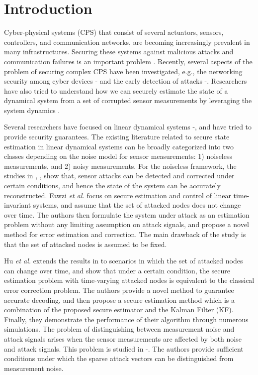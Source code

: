 
\section{Introduction}\label{sec:introduction}

Cyber-physical systems (CPS) that consist of several actuators, sensors, controllers, and communication networks, are becoming increasingly prevalent in many infrastructures. Securing these systems against malicious attacks and communication failures is an important problem \cite{cps1}. Recently, several aspects of the problem of securing complex CPS have been investigated, e.g., the networking security among cyber devices \cite{security_0}-\!\!\cite{comm_net_4} and the early detection of attacks \cite{comm_early_1}-\!\!\cite{comm_early_2}. Researchers have also tried to understand how we can securely estimate the state of a dynamical system from a set of corrupted sensor measurements by leveraging the system dynamics \cite{Fawzi:2014}.



Several researchers have focused on linear dynamical systems \cite{Fawzi:2014}-\!\!\cite{new4}, and have tried to provide security guarantees. The existing literature related to secure state estimation in linear dynamical systems can be broadly categorized into two classes depending on the noise model for sensor measurements: 1) noiseless measurements, and 2) noisy measurements. For the noiseless framework, the studies in \cite{cps1}, \cite{Fawzi:2014}, \cite{new2} show that, sensor attacks can be detected and corrected under certain conditions, and hence the state of the system can be accurately reconstructed. Fawzi \textit{et al.} \cite{Fawzi:2014} focus on secure estimation and control of linear time-invariant systems, and assume that the set of attacked nodes does not change over time. The authors then formulate the system under attack as an estimation problem without any limiting assumption on attack signals, and propose a novel method for error estimation and correction. The main drawback of the study is that the set of attacked nodes is assumed to be fixed.


Hu \textit{et al.} \cite{Hu:2016uav} extends the results in \cite{Fawzi:2014} to scenarios in which the set of attacked nodes can change over time, and show that under a certain condition, the secure estimation problem with time-varying attacked nodes is equivalent to the classical error correction problem. The authors provide a novel method to guarantee accurate decoding, and then propose a secure estimation method which is a combination of the proposed secure estimator and the Kalman Filter (KF). Finally, they demonstrate the performance of their algorithm through numerous simulations. The problem of distinguishing between measurement noise and attack signals arises when the sensor measurements are affected by both noise and attack signals. This problem is studied in \cite{new4}-\!\!\cite{new10}. The authors provide sufficient conditions under which the
sparse attack vectors can be distinguished from measurement noise.


